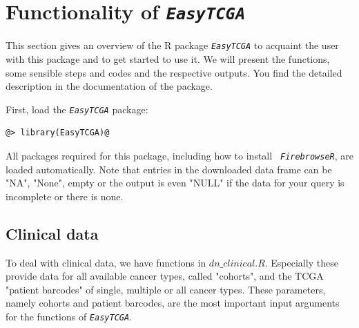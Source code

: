 \documentclass{TechReport}
\begin{document}
\section{Functionality of \texttt{\em EasyTCGA}}
This section gives an overview of the R package \texttt{\em EasyTCGA} to acquaint
the user with this package and to get started to use it.
We will present the functions, some sensible steps and codes and the respective
outputs. You find the detailed description in the
documentation of the package.

First, load the \texttt{\em EasyTCGA} package:
\begin{lstlisting}[style=base]
@> library(EasyTCGA)@
\end{lstlisting}
All packages required for this package, including how to install \texttt{\em
  FirebrowseR}, are loaded automatically. 
Note that entries in the downloaded data frame can be "NA", "None", empty or the output is even
"NULL" if the data for your query is incomplete or there is none.

\subsection{Clinical data}
To deal with clinical data, we have functions in $dn\_clinical.R$.
Especially these provide data for all available cancer types, called
"cohorts", and the TCGA "patient barcodes" of single, multiple or all
cancer types. These parameters, namely cohorts and patient barcodes,
are the most important input arguments for the functions of
\texttt{\em EasyTCGA}.
\end{document}
